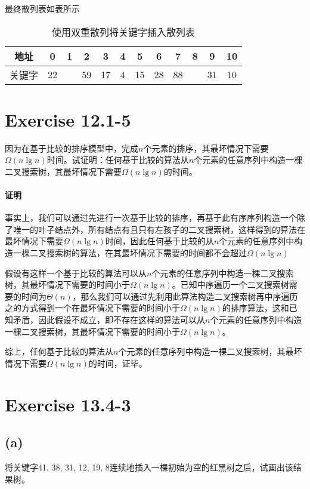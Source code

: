 \documentclass{article}
\begin{document}
最终散列表如表所示
\begin{table}[H]
    \centering
    \begin{tabular}{|c|c|c|c|c|c|c|c|c|c|c|c|}
    \hline
    地址 & 0 & 1 & 2 & 3 & 4 & 5 & 6 & 7 & 8 & 9 & 10 \\ \hline
    关键字 & 22 &  & 59 & 17 & 4 & 15 & 28 & 88 &  & 31 & 10 \\ \hline
    \end{tabular}
    \caption{使用双重散列将关键字插入散列表}
\end{table}

\section{Exercise 12.1-5}
因为在基于比较的排序模型中，完成$n$个元素的排序，其最坏情况下需要$\Omega(n \lg{n})$时间。试证明：任何基于比较的算法从$n$个元素的任意序列中构造一棵二叉搜索树，其最坏情况下需要$\Omega(n \lg{n})$的时间。

\paragraph{证明}
事实上，我们可以通过先进行一次基于比较的排序，再基于此有序序列构造一个除了唯一的叶子结点外，所有结点有且只有左孩子的二叉搜索树，这样得到的算法在最坏情况下需要$\Omega(n \lg{n})$时间，因此任何基于比较的从$n$个元素的任意序列中构造一棵二叉搜索树的算法，在其最坏情况下需要的时间都不会超过$\Omega(n \lg{n})$
\par
假设有这样一个基于比较的算法可以从$n$个元素的任意序列中构造一棵二叉搜索树，其最坏情况下需要的时间小于$\Omega(n \lg{n})$。已知中序遍历一个二叉搜索树需要的时间为$\Theta(n)$，那么我们可以通过先利用此算法构造二叉搜索树再中序遍历之的方式得到一个在最坏情况下需要的时间小于$\Omega(n \lg{n})$的排序算法，这和已知矛盾，因此假设不成立，即不存在这样的算法可以从$n$个元素的任意序列中构造一棵二叉搜索树，其最坏情况下需要的时间小于$\Omega(n \lg{n})$。
\par
综上，任何基于比较的算法从$n$个元素的任意序列中构造一棵二叉搜索树，其最坏情况下需要$\Omega(n \lg{n})$的时间，证毕。

\section{Exercise 13.4-3}
\subsection*{(a)}
将关键字41, 38, 31, 12, 19, 8连续地插入一棵初始为空的红黑树之后，试画出该结果树。
\end{document}
